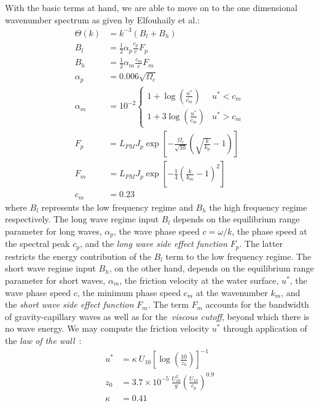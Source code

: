 With the basic terms at hand, we are able to move on to the one dimensional 
wavenumber spectrum as given by Elfouhaily et al.:
%
\begin{subequations}
\begin{align}
 \Theta(k) &= k^{-3}(B_l + B_h) \\
 B_l &= \frac{1}{2}\alpha_p\frac{c_p}{c}F_p \\
 B_h &= \frac{1}{2}\alpha_m\frac{c_m}{c}F_m \\
 \alpha_p &= 0.006\sqrt{\Omega_c} \\
 \alpha_m &= 10^{-2}\begin{cases}
	1 + \log\left(\frac{u^{\ast}}{c_m}\right) & u^{\ast} < c_m \\
	1 + 3\log\left(\frac{u^{\ast}}{c_m}\right) & u^{\ast} > c_m
	\end{cases} \\
 F_p &= L_{PM}J_p\exp\left[- 
\frac{\Omega_c}{\sqrt{10}}\left(\sqrt{\frac{k}{k_p}} - 1\right)\right] \\
 F_m &= L_{PM}J_p\exp\left[- 
\frac{1}{4}\left(\frac{k}{k_m} - 1\right)^2\right] \\
c_m &= 0.23
\end{align}
\end{subequations}
%
where $B_l$ represents the low frequency regime and $B_h$ the high frequency
regime respectively. The long wave regime input $B_l$ depends on the
equilibrium range parameter for long waves, $\alpha_p$, the wave phase speed
$c = \omega/k$, the phase speed at the spectral peak $c_p$, and the \emph{long wave side
effect function} $F_p$. The latter restricts the energy contribution of the
$B_l$ term to the low frequency regime. The short wave regime input $B_h$,
on the other hand, depends on the equilibrium range parameter for short waves,
$\alpha_m$, the friction velocity at the water surface, $u^{\ast}$, the wave
phase speed $c$, the minimum phase speed $c_m$ at the wavenumber $k_m$, and
the \emph{short wave side effect function} $F_m$. The term $F_m$ accounts for
the bandwidth of gravity-capillary waves as well as for the~\emph{viscous cutoff},
beyond which there is no wave energy. We may compute the friction velocity
$u^{\ast}$ through application of the \emph{law of the wall}~\cite{article:vonKarman1931}:
%
\begin{subequations}
\begin{align}
u^{\ast} &= \kappa~U_{10} \left[\log\left(\frac{10}{z_0}\right)\right]^{-1}\\
z_0 &= 3.7 \times 10^{-5}~\frac{U_{10}^2}{g}
\left(\frac{U_{10}}{c_p}\right)^{0.9} \label{eq:z_0}\\
\kappa &= 0.41
\end{align}
\end{subequations}
